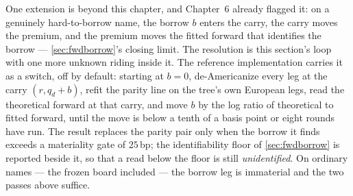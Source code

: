 One extension is beyond this chapter, and Chapter~6 already flagged
it: on a genuinely hard-to-borrow name, the borrow $b$ enters the
carry, the carry moves the premium, and the premium moves the fitted
forward that identifies the borrow --- \cref{sec:fwdborrow}'s closing
limit.  The resolution is this section's loop with one more unknown
riding inside it.  The reference implementation carries it as a
switch, off by default: starting at $b=0$, de-Americanize every leg
at the carry $(r,q_d+b)$, refit the parity line on the tree's own
European legs, read the theoretical forward at that carry, and move
$b$ by the log ratio of theoretical to fitted forward, until the move
is below a tenth of a basis point or eight rounds have run.  The
result replaces the parity pair only when the borrow it finds
exceeds a materiality gate of $25$\,bp; the identifiability floor of
\cref{sec:fwdborrow} is reported beside it, so that a read below the
floor is still \emph{unidentified}.  On ordinary
names --- the frozen board included --- the borrow leg is immaterial
and the two passes above suffice.
